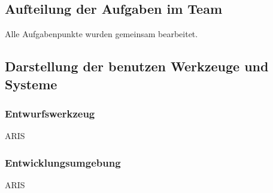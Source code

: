 \subsection*{Aufteilung der Aufgaben im Team}
Alle Aufgabenpunkte wurden gemeinsam bearbeitet.
\subsection*{Darstellung der benutzen Werkzeuge und Systeme}
\subsubsection*{Entwurfswerkzeug}
ARIS
\subsubsection*{Entwicklungsumgebung}
ARIS
